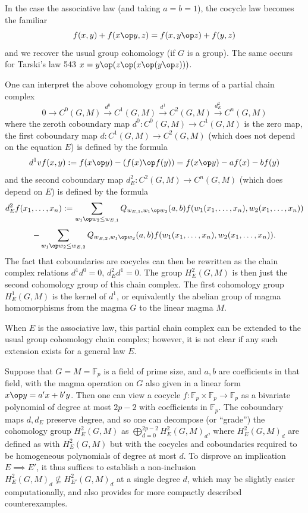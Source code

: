 \begin{remark} In the case the associative law (and taking $a=b=1$), the cocycle law becomes the familiar
  $$ f(x,y) + f(x \op y, z) = f(x, y \op z) + f(y,z)$$
and we recover the usual group cohomology (if $G$ is a group).  The same occurs for Tarski's law 543
$x = y \op (z \op (x \op (y \op z)))$.
\end{remark}

\begin{remark}  One can interpret the above cohomology group in terms of a partial chain complex
$$ 0 \to C^0(G,M) \stackrel{d^0}{\to} C^1(G,M) \stackrel{d^1}{\to} C^2(G,M) \stackrel{d^2_E}{\to} C^n(G,M)$$
where the zeroth coboundary map $d^0: C^0(G,M) \to C^1(G,M)$ is the zero map, the first coboundary map $d: C^1(G,M) \to C^2(G,M)$ (which does not depend on the equation $E$) is defined by the formula
$$ d^1 vf(x,y) := f(x \op y) - (f(x) \op f(y)) = f(x \op y) - af(x) - bf(y)$$
and the second coboundary map $d^2_E: C^2(G,M) \to C^n(G,M)$ (which does depend on $E$) is defined by the formula
$$ d^2_E f(x_1,\dots,x_n) := \sum_{w_1 \op w_2 \leq w_{E,1}} Q_{w_{E,1},w_1 \op w_2}(a,b) f(w_1(x_1,\dots,x_n), w_2(x_1,\dots,x_n))$$
$$ - \sum_{w_1 \op w_2 \leq w_{E,2}} Q_{w_{E,2},w_1 \op w_2}(a,b) f(w_1(x_1,\dots,x_n), w_2(x_1,\dots,x_n)).$$
The fact that coboundaries are cocycles can then be rewritten as the chain complex relations $d^1 d^0=0$, $d^2_E d^1 = 0$.  The group $H^2_E(G,M)$ is then just the second cohomology group of this chain complex.  The first cohomology group $H^1_E(G,M)$ is the kernel of $d^1$, or equivalently the abelian group of magma homomorphisms from the magma $G$ to the linear magma $M$.

When $E$ is the associative law, this partial chain complex can be extended to the usual group cohomology chain complex; however, it is not clear if any such extension exists for a general law $E$.
\end{remark}

\begin{remark}  Suppose that $G = M = \mathbb{F}_p$ is a field of prime size, and $a,b$ are coefficients in that field, with the magma operation on $G$ also given in a linear form $x \op y = a'x  + b' y$.  Then one can view a cocycle $f: \mathbb{F}_p \times \mathbb{F}_p \to \mathbb{F}_p$ as a bivariate polynomial of degree at most $2p-2$ with coefficients in $ \mathbb{F}_p$.  The coboundary maps $d, d_E$ preserve degree, and so one can decompose (or ``grade'') the cohomology group $H^2_E(G,M)$ as $\bigoplus_{d=0}^{2p-2} H^2_E(G,M)_d$, where $H^2_E(G,M)_d$ are defined as with $H^2_E(G,M)$ but with the cocycles and coboundaries required to be homogeneous polynomials of degree at most $d$.  To disprove an implication $E \implies E'$, it thus suffices to establish a non-inclusion $H^2_E(G,M)_d \not\subseteq H^2_{E'}(G,M)_d$ at a single degree $d$, which may be slightly easier computationally, and also provides for more compactly described counterexamples.
\end{remark}



